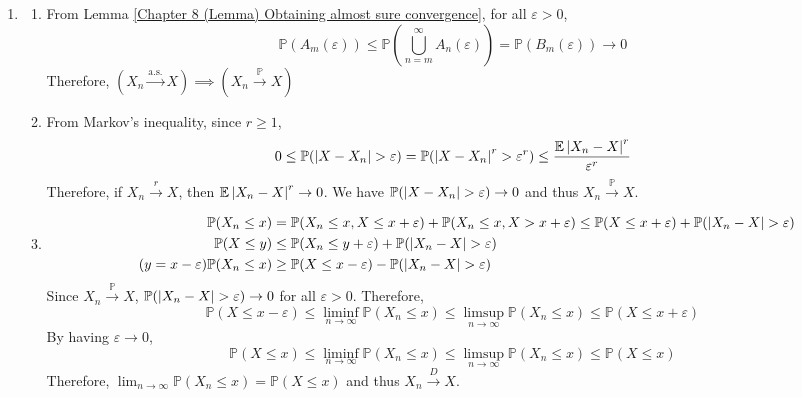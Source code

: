 \documentclass{huhtakm-template-book}
\newcommand{\prob}{\mathbb{P}}
\newcommand{\expect}{\mathbb{E}}
\begin{document}
\begin{proofing}
	\begin{enumerate}
		\item \begin{enumerate}
			\item From Lemma \ref{Chapter 8 (Lemma) Obtaining almost sure convergence}, for all $\varepsilon>0$,
			\begin{equation*}
				\prob(A_{m}(\varepsilon))\leq\prob\left(\bigcup_{n=m}^{\infty}A_{n}(\varepsilon)\right)=\prob(B_{m}(\varepsilon))\to 0
			\end{equation*}
			Therefore, $(X_{n}\xrightarrow{\text{a.s.}}X)\implies(X_{n}\xrightarrow{\prob}X)$
			\item From Markov's inequality, since $r\geq 1$,
			\begin{equation*}
				0\leq\prob(\abs{X-X_{n}}>\varepsilon)=\prob(\abs{X-X_{n}}^{r}>\varepsilon^{r})\leq\frac{\expect\abs{X_{n}-X}^{r}}{\varepsilon^{r}}
			\end{equation*}
			Therefore, if $X_{n}\xrightarrow{r}X$, then $\expect\abs{X_{n}-X}^{r}\to 0$. We have $\prob(\abs{X-X_{n}}>\varepsilon)\to 0$ and thus $X_{n}\xrightarrow{\prob}X$.
			\item 
			\begin{align*}
				\prob(X_{n}\leq x)&=\prob(X_{n}\leq x,X\leq x+\varepsilon)+\prob(X_{n}\leq x,X>x+\varepsilon)\leq\prob(X\leq x+\varepsilon)+\prob(\abs{X_{n}-X}>\varepsilon)\\
				\prob(X\leq y)&\leq\prob(X_{n}\leq y+\varepsilon)+\prob(\abs{X_{n}-X}>\varepsilon)\\
				\tag{$y=x-\varepsilon$}
				\prob(X_{n}\leq x)
				&\geq\prob(X\leq x-\varepsilon)-\prob(\abs{X_{n}-X}>\varepsilon)
			\end{align*}
			Since $X_{n}\xrightarrow{\prob}X$, $\prob(\abs{X_{n}-X}>\varepsilon)\to 0$ for all $\varepsilon>0$. Therefore,
			\begin{equation*}
				\prob(X\leq x-\varepsilon)\leq\liminf_{n\to\infty}\prob(X_{n}\leq x)\leq\limsup_{n\to\infty}\prob(X_{n}\leq x)\leq\prob(X\leq x+\varepsilon)
			\end{equation*}
			By having $\varepsilon\to 0$,
			\begin{equation*}
				\prob(X\leq x)\leq\liminf_{n\to\infty}\prob(X_{n}\leq x)\leq\limsup_{n\to\infty}\prob(X_{n}\leq x)\leq\prob(X\leq x)
			\end{equation*}
			Therefore, $\lim_{n\to\infty}\prob(X_{n}\leq x)=\prob(X\leq x)$ and thus $X_{n}\xrightarrow{D}X$.
		\end{enumerate}

\end{enumerate}
\end{proofing}
\end{document}
